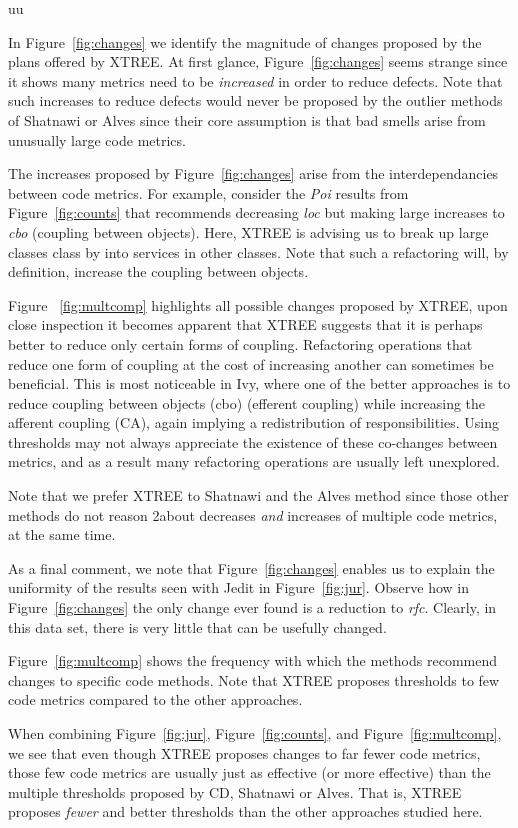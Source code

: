 uu \documentclass[final,twocolumn,5p]{elsarticle}
\newcommand{\fig}[1]{Figure~\ref{fig:#1}}
\theoremstyle{break}
\begin{document}
\begin{itemize}
In \fig{changes} we identify the magnitude of changes proposed by the plans offered by XTREE.
At first glance, \fig{changes} seems strange since it 
shows many metrics need to be {\em increased} in order
to reduce defects. Note that such increases  to reduce
defects would never be proposed by the outlier methods
of Shatnawi or Alves since their core assumption is that bad
smells arise from unusually large code metrics.

The increases proposed by 
\fig{changes} arise from the interdependancies between
code metrics. For example, consider the {\em Poi} results
from \fig{counts} that recommends decreasing {\em loc}
but making large increases to {\em cbo} (coupling between
objects). Here, XTREE is advising us to break up
large classes class by into services
in other classes. Note that such a refactoring will, by
definition, increase the coupling between objects. 

Figure ~\ref{fig:multcomp} highlights all possible changes proposed by XTREE, upon close inspection it becomes apparent that XTREE suggests that it is perhaps better to reduce only certain forms of coupling. Refactoring operations that reduce one form of coupling at the cost of increasing another can sometimes be beneficial. This is most noticeable in Ivy, where one of the better approaches is to reduce coupling between objects (cbo) (efferent coupling) while increasing the afferent coupling (CA), again implying a redistribution of responsibilities. Using thresholds may not always appreciate the existence of these co-changes between metrics, and as a result many refactoring operations are usually left unexplored.

Note that we prefer XTREE to Shatnawi and the Alves
method since those other methods
do not reason
2about decreases {\em and} increases of multiple 
code metrics, at the same time.

As a final comment, we note
that  \fig{changes} enables us to explain the uniformity
of the results seen with Jedit in \fig{jur}.
Observe how in \fig{changes} the only change ever
found is a reduction to {\em rfc}. Clearly, in this
data set, there is very little that can be usefully changed.


\fig{multcomp} shows the frequency with which the methods
recommend changes to specific code methods.
Note that XTREE proposes thresholds to
few code metrics compared to the other approaches. 

When combining  \fig{jur}, \fig{counts}, and \fig{multcomp}, we   see that
even though XTREE proposes changes to far fewer code metrics, those few
code metrics are usually just as effective (or
more effective) than the multiple
thresholds
proposed by CD, Shatnawi or Alves.  That is, XTREE proposes
{\em fewer} and better thresholds than the other approaches studied here.


\end{itemize}
\end{document}
